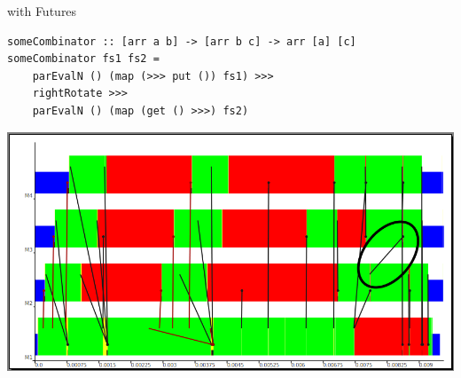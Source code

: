 \begin{frame}[fragile]{with Futures}
\begin{lstlisting}[frame=htrbl]
someCombinator :: [arr a b] -> [arr b c] -> arr [a] [c]
someCombinator fs1 fs2 =
	parEvalN () (map (>>> put ()) fs1) >>>
	rightRotate >>>
	parEvalN () (map (get () >>>) fs2)
\end{lstlisting}
\pause
\begin{center}
\includegraphics[scale=0.35]{images/withFutures}
\end{center}
\end{frame}